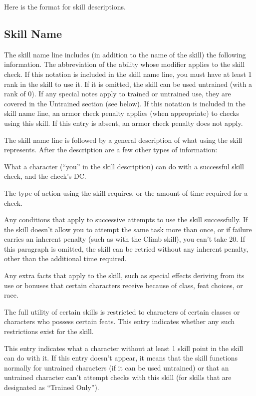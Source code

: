 Here is the format for skill descriptions.

\subsection*{Skill Name}
The skill name line includes (in addition to the name of the skill) the following information.
 The abbreviation of the ability whose modifier applies to the skill check.
 If this notation is included in the skill name line, you must have at least 1 rank in the skill to use it. If it is omitted, the skill can be used untrained (with a rank of 0). If any special notes apply to trained or untrained use, they are covered in the Untrained section (see below).
 If this notation is included in the skill name line, an armor check penalty applies (when appropriate) to checks using this skill. If this entry is absent, an armor check penalty does not apply.

\par The skill name line is followed by a general description of what using the skill represents. After the description are a few other types of information:

 What a character (``you'' in the skill description) can do with a successful skill check, and the check's DC.

 The type of action using the skill requires, or the amount of time required for a check.

 Any conditions that apply to successive attempts to use the skill successfully. If the skill doesn't allow you to attempt the same task more than once, or if failure carries an inherent penalty (such as with the Climb skill), you can't take 20. If this paragraph is omitted, the skill can be retried without any inherent penalty, other than the additional time required.

 Any extra facts that apply to the skill, such as special effects deriving from its use or bonuses that certain characters receive because of class, feat choices, or race.

 The full utility of certain skills is restricted to characters of certain classes or characters who possess certain feats. This entry indicates whether any such restrictions exist for the skill.

 This entry indicates what a character without at least 1 skill point in the skill can do with it. If this entry doesn't appear, it means that the skill functions normally for untrained characters (if it can be used untrained) or that an untrained character can't attempt checks with this skill (for skills that are designated as ``Trained Only'').

